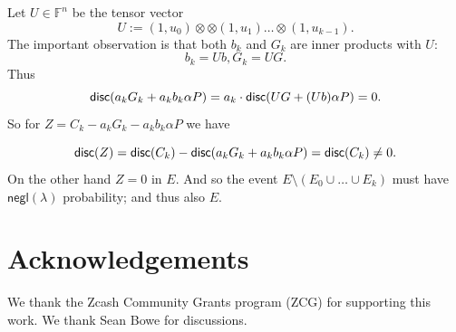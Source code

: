 \documentclass[11pt]{article} %
\newcommand{\F}{\ensuremath{\mathbb F}\xspace}
\newcommand{\adv}{\ensuremath{\mathcal A}\xspace}
\newcommand{\negl}{\ensuremath{\mathsf{negl}(\lambda)}\xspace}
\newcommand{\defeq}{:=}
\newcommand{\fn}{\ensuremath{\F^n}\xspace}
\begin{document}
Let $U\in \fn$ be the tensor vector 
\[U\defeq (1,u_{0})\otimes\otimes (1,u_1)\ldots\otimes (1,u_{k-1}).\]
The important observation is that both $b_k$ and $G_k$ are inner products with $U$:
\[b_k=Ub,G_k=UG.\]
Thus
\[\mathsf{disc}(a_kG_k + a_k b_k\alpha P) = a_k\cdot \mathsf{disc}(UG+(Ub)\alpha P)=0.\]
So for $Z=C_k - a_k G_k - a_k b_k \alpha P$ we have 

\[\mathsf{disc}(Z)=\mathsf{disc}(C_k)- \mathsf{disc}(a_k G_k + a_k b_k \alpha P) = \mathsf{disc}(C_k)\neq 0.\]
On the other hand $Z=0$ in $E$.
And so the event $E\setminus (E_0\cup\ldots\cup  E_k)$ must have \negl probability; and thus also $E$.

 \section*{Acknowledgements}   We thank the Zcash Community Grants program (ZCG) for supporting this work. We thank Sean Bowe for discussions. 
 
 

    
\end{document}
